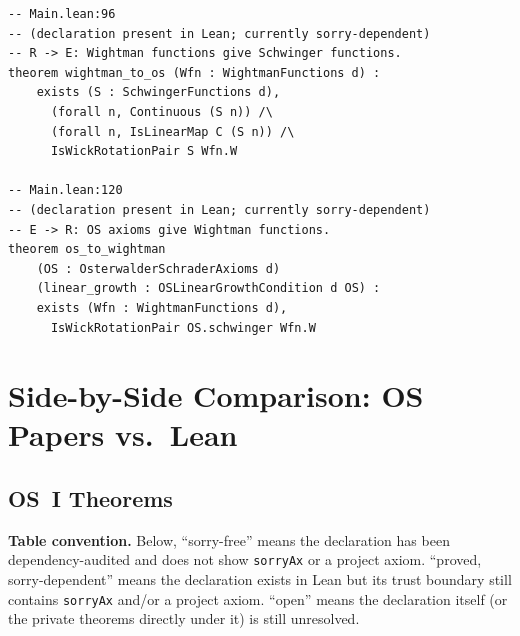 \documentclass[11pt,a4paper]{article}
\begin{document}
\begin{lstlisting}
-- Main.lean:96
-- (declaration present in Lean; currently sorry-dependent)
-- R -> E: Wightman functions give Schwinger functions.
theorem wightman_to_os (Wfn : WightmanFunctions d) :
    exists (S : SchwingerFunctions d),
      (forall n, Continuous (S n)) /\
      (forall n, IsLinearMap C (S n)) /\
      IsWickRotationPair S Wfn.W

-- Main.lean:120
-- (declaration present in Lean; currently sorry-dependent)
-- E -> R: OS axioms give Wightman functions.
theorem os_to_wightman
    (OS : OsterwalderSchraderAxioms d)
    (linear_growth : OSLinearGrowthCondition d OS) :
    exists (Wfn : WightmanFunctions d),
      IsWickRotationPair OS.schwinger Wfn.W
\end{lstlisting}


\section{Side-by-Side Comparison: OS Papers vs.\ Lean}

\subsection{OS~I Theorems}

\noindent
\textbf{Table convention.}
Below, ``sorry-free'' means the declaration has been dependency-audited and does
not show \texttt{sorryAx} or a project axiom. ``proved, sorry-dependent'' means
the declaration exists in Lean but its trust boundary still contains
\texttt{sorryAx} and/or a project axiom. ``open'' means the declaration itself (or
the private theorems directly under it) is still unresolved.
\end{document}
